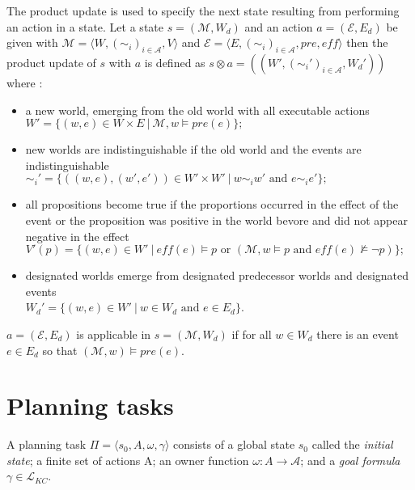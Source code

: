 The product update is used to specify the next state resulting from performing an action in a state.
Let a state $s = (\mathcal{M},W_d)$ and an action $a=(\mathcal{E},E_d)$ be given with $\mathcal{M}=\langle W,(\sim_i)_{i \in \mathcal{A}}, V\rangle $ and $\mathcal{E}=\langle E, (\sim_i)_{i \in \mathcal{A}},pre, \textit{eff} \rangle$
then the product update of $s$ with $a$ is defined as $s \otimes a = ((W',(\sim_i')_{i \in \mathcal{A}}, W_d'))$ where :
 \begin{itemize}
   \item a new world, emerging from the old world with all executable actions \\
   $W'=\{(w,e)\in W \times E ~|~ \mathcal{M}, w \models pre(e)\};$
   \item new worlds are indistinguishable if the old world and the events are indistinguishable \\
   $\sim_i'=\{((w,e),(w',e')) \in W'\times W' ~|~ w \sim_i w' \text{ and } e \sim_i e'\};$
   \item all propositions become true if the proportions occurred in the effect of the event or the proposition was positive in the world bevore and did not appear negative in the effect \\
   $V'(p) = \{ (w,e) \in W' ~|~ \textit{eff}(e) \models p \text{ or } (\mathcal{M},w \models p \text{ and } \textit{eff}(e)\not \models \neg p)\};$
   \item designated worlds emerge from designated predecessor worlds and designated events \\
   $W_d' = \{ (w,e) \in W' ~|~ w \in W_d \text{ and } e \in E_d\}$.
 \end{itemize}
$a=(\mathcal{E}, E_d)$ is applicable in $s=(\mathcal{M},W_d)$ if for all $w \in W_d$ there is an event $e \in E_d$ so that $(\mathcal{M},w) \models pre(e)$.



\section{Planning tasks}


A planning task $\Pi = \langle s_0, A, \omega, \gamma \rangle$ consists of a global state $s_0$ called the \textit{initial state}; a finite set of actions A; an owner function $\omega: A \rightarrow \mathcal{A}$; and a \textit{goal formula} $\gamma \in \mathcal{L}_{KC}$.

